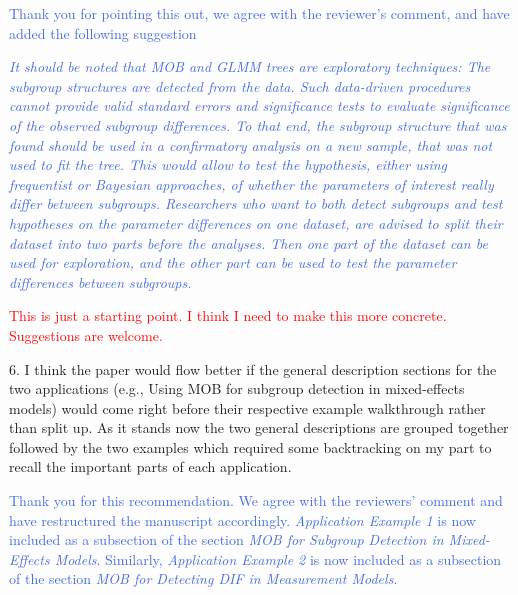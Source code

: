 \documentclass{letter}
\newcommand{\auth}[1]{\textcolor{RoyalBlue}{#1}}
\newcommand{\MF}[1]{\textcolor{red}{#1}}
\begin{document}
\auth{Thank you for pointing this out, we agree with the reviewer's comment, and have added the following suggestion }

\auth{\textit{It should be noted that MOB and GLMM trees are exploratory techniques: The subgroup structures are detected from the data. Such data-driven procedures cannot provide valid standard errors and significance tests to evaluate significance of the observed subgroup differences. To that end, the subgroup structure that was found should be used in a confirmatory analysis on a new sample, that was not used to fit the tree. This would allow to test the hypothesis, either using frequentist or Bayesian approaches, of whether the parameters of interest really differ between subgroups. Researchers who want to both detect subgroups and test hypotheses on the parameter differences on one dataset, are advised to split their dataset into two parts before the analyses. Then one part of the dataset can be used for exploration, and the other part can be used to test the parameter differences between subgroups.}}

\MF{This is just a starting point. I think I need to make this more concrete. Suggestions are welcome.}

6.      I think the paper would flow better if the general description sections for the two applications (e.g., Using MOB for subgroup detection in mixed-effects models) would come right before their respective example walkthrough rather than split up. As it stands now the two general descriptions are grouped together followed by the two examples which required some backtracking on my part to recall the important parts of each application.

\auth{Thank you for this recommendation. We agree with the reviewers' comment and have restructured the manuscript accordingly. \textit{Application Example 1} is now included as a subsection of the section \textit{MOB for Subgroup Detection in Mixed-Effects Models}. Similarly, \textit{Application Example 2} is now included as a subsection of the section \textit{MOB for Detecting DIF in Measurement Models}.}
\end{document}
